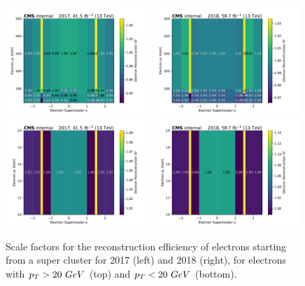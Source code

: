\begin{figure}[ht!]
  \begin{center}
    \includegraphics[width=0.49\textwidth]{ScaleFactors/Electron/electron_reco_2017.pdf}
    \includegraphics[width=0.49\textwidth]{ScaleFactors/Electron/electron_reco_2018.pdf} \\
    \includegraphics[width=0.49\textwidth]{ScaleFactors/Electron/electron_reco_ptbelow20_2017.pdf}
    \includegraphics[width=0.49\textwidth]{ScaleFactors/Electron/electron_reco_ptbelow20_2018.pdf}

    \caption{
      Scale factors for the reconstruction efficiency of electrons starting from a super cluster for 2017 (left) and 2018 (right), for electrons with
      $\pt > 20 \ GeV$ (top) and $\pt < 20 \ GeV$ (bottom).
    }
    \label{fig:sf_electron_reco}
  \end{center}
\end{figure}

